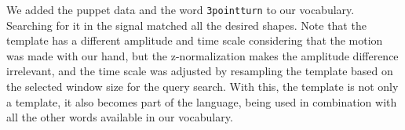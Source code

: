 We added the puppet data and the word \texttt{3pointturn} to our vocabulary. Searching for it in the signal matched all the desired shapes. Note that the template has a different amplitude and time scale considering that the motion was made with our hand, but the z-normalization makes the amplitude difference irrelevant, and the time scale was adjusted by resampling the template based on the selected window size for the query search. With this, the template is not only a template, it also becomes part of the language, being used in combination with all the other words available in our vocabulary.



%
%
%
%
%
%


